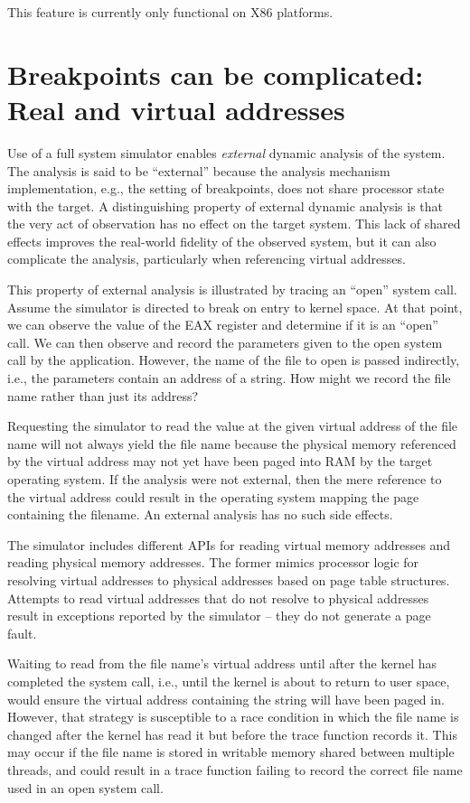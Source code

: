 \documentclass[titlepage]{article}
\begin{document}
\begin{appendices}
This feature is currently only functional on X86 platforms.

\section{Breakpoints can be complicated: Real and virtual addresses}
\label{external}
Use of a full system simulator enables \textit{external} dynamic analysis of the system.  The analysis is said to be
“external” because the analysis mechanism implementation, e.g., the setting of breakpoints,  does not 
share processor state with the target.
A distinguishing property of external dynamic analysis is that the very act of observation has no effect on the target
system.  This lack of shared effects improves the real-world fidelity of the observed system, but it can also complicate the
analysis, particularly when referencing virtual addresses. 

This property of external analysis is illustrated by tracing an “open” system call. 
Assume the simulator is directed to break on entry to kernel space.  At that point, we can observe the value
of the EAX register and determine if it is an “open” call.  We can then observe and record the
parameters given to the open system call by the application.  However, the name of the file to open
is passed indirectly, i.e., the parameters contain an address of a string.  How might we record
the file name rather than just its address?   

Requesting the simulator to read the value at the given virtual address of the
file name will not always yield the file name because the
physical memory referenced by the virtual address may not yet have been paged into RAM by the target operating system.
If the analysis were not external, then the mere reference to the virtual address could result in the
operating system mapping the page containing the filename.  An external analysis has no such side effects.

The simulator includes different APIs for reading virtual memory addresses and reading physical memory addresses.
The former mimics processor logic for resolving virtual addresses to physical addresses based on page table
structures. Attempts to read virtual addresses that do not resolve to physical addresses result in exceptions reported
by the simulator -- they do not generate a page fault.

Waiting to read from the file name's virtual address until after the kernel has completed the system call, i.e.,
until the kernel is about to return to user space, would ensure the virtual address containing the string
will have been paged in.  However, that strategy is susceptible to a race condition in which the file
name is changed after the kernel has read it but before the trace function records it.  This may occur
if the file name is stored in writable memory shared between multiple threads, and could result in a trace function
failing to record the correct file name used in an open system call.
 

\end{appendices}
\end{document}
